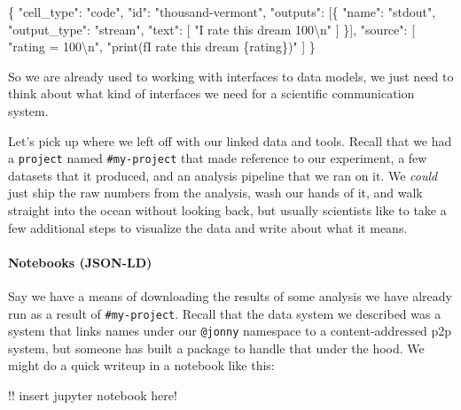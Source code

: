 \documentclass[10pt]{tufte-book}
\newenvironment{Shaded}{}{}
\newcommand{\CharTok}[1]{\textcolor[rgb]{0.25,0.44,0.63}{#1}}
\newcommand{\DataTypeTok}[1]{\textcolor[rgb]{0.56,0.13,0.00}{#1}}
\newcommand{\FunctionTok}[1]{\textcolor[rgb]{0.02,0.16,0.49}{#1}}
\newcommand{\OtherTok}[1]{\textcolor[rgb]{0.00,0.44,0.13}{#1}}
\newcommand{\StringTok}[1]{\textcolor[rgb]{0.25,0.44,0.63}{#1}}
\begin{document}
\begin{Shaded}
\begin{Highlighting}[]
\FunctionTok{\{}
  \DataTypeTok{"cell\_type"}\FunctionTok{:} \StringTok{"code"}\FunctionTok{,}
  \DataTypeTok{"id"}\FunctionTok{:} \StringTok{"thousand{-}vermont"}\FunctionTok{,}
  \DataTypeTok{"outputs"}\FunctionTok{:} \OtherTok{[}\FunctionTok{\{}
    \DataTypeTok{"name"}\FunctionTok{:} \StringTok{"stdout"}\FunctionTok{,}
    \DataTypeTok{"output\_type"}\FunctionTok{:} \StringTok{"stream"}\FunctionTok{,}
    \DataTypeTok{"text"}\FunctionTok{:} \OtherTok{[}
      \StringTok{"I rate this dream 100}\CharTok{\textbackslash{}n}\StringTok{"}
    \OtherTok{]}
  \FunctionTok{\}}\OtherTok{]}\FunctionTok{,}
  \DataTypeTok{"source"}\FunctionTok{:} \OtherTok{[}
    \StringTok{"rating = 100}\CharTok{\textbackslash{}n}\StringTok{"}\OtherTok{,}
    \StringTok{"print(f\textquotesingle{}I rate this dream \{rating\}\textquotesingle{})"}
  \OtherTok{]}
\FunctionTok{\}}
\end{Highlighting}
\end{Shaded}

So we are already used to working with interfaces to data models, we
just need to think about what kind of interfaces we need for a
scientific communication system.

Let's pick up where we left off with our linked data and tools. Recall
that we had a \texttt{project} named \texttt{\#my-project} that made
reference to our experiment, a few datasets that it produced, and an
analysis pipeline that we ran on it. We \emph{could} just ship the raw
numbers from the analysis, wash our hands of it, and walk straight into
the ocean without looking back, but usually scientists like to take a
few additional steps to visualize the data and write about what it
means.


\paragraph{Notebooks (JSON-LD)}

Say we have a means of downloading the results of some analysis we have
already run as a result of \texttt{\#my-project}. Recall that the data
system we described was a system that links names under our
\texttt{@jonny} namespace to a content-addressed p2p system, but someone
has built a package to handle that under the hood. We might do a quick
writeup in a notebook like this:

!! insert jupyter notebook here!
\end{document}
